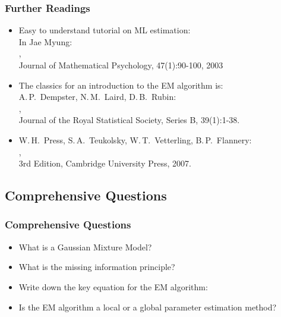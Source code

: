 \begin{frame}
  \frametitle{Further Readings}
   
  \small
  \begin{itemize}
    \item Easy to understand tutorial on ML estimation: \\[.15cm]
      In Jae Myung: \\
      \point\href{http://faculty.psy.ohio-state.edu/myung/personal/mle.pdf}{}, \\
      Journal of Mathematical Psychology, 47(1):90-100, 2003 \\[.25cm]
    \item The classics for an introduction to the EM algorithm is: \\[.15cm]
      A.\,P.\ Dempster, N.\,M.\ Laird, D.\,B.\ Rubin: \\
      \point\href{http://web.mit.edu/6.435/www/Dempster77.pdf}{}, \\
      Journal of the Royal Statistical Society, Series B, 39(1):1-38. \\[.25cm]
    \item W.\,H.\ Press, S.\,A.\ Teukolsky, W.\,T.\ Vetterling, B.\,P.\ Flannery: \\
      \point\href{http://www.nr.com/}{}, \\
      3rd Edition, Cambridge University Press, 2007.
  \end{itemize}
\end{frame}


\subsection{Comprehensive Questions}

\begin{frame}
  \frametitle{Comprehensive Questions}

  \begin{itemize}
    \item What is a Gaussian Mixture Model? \\[0.5cm]
    \item What is the missing information principle? \\[0.5cm]
    \item Write down the key equation for the EM algorithm: \\[0.5cm]
    \item Is the EM algorithm a local or a global parameter estimation method?
  \end{itemize}
\end{frame}
